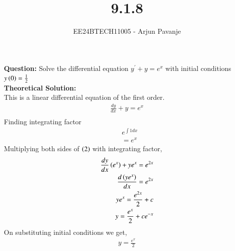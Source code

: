 \documentclass[journal]{IEEEtran}
\begin{document}

\vspace{3cm}

\title{9.1.8}
\author{EE24BTECH11005 - Arjun Pavanje}
{\let\newpage\relax\maketitle}
\textbf{Question:}
Solve the differential equation $y^{\prime}+y=e^x$ with initial conditions $y\left(0\right)=\frac{1}{2}$
\solution\\
\textbf{Theoretical Solution:}\\
This is a linear differential equation of the first order.
\begin{align}
  \frac{dy}{dx} + y = e^x\\
\end{align}
Finding integrating factor 
\begin{align}
  &e^{\int 1dx}\\
  &=e^x
\end{align}
Multiplying both sides of $\left(2\right)$ with integrating factor,
\begin{align}
  \frac{dy}{dx}\left(e^x\right) + ye^x = e^{2x}\\
  \frac{d\left(ye^x\right)}{dx}=e^{2x}\\
  ye^x=\frac{e^{2x}}{2}+c\\
  y=\frac{e^x}{2}+ce^{-x}
\end{align}
On substituting initial conditions we get,
\begin{align}
  y=\frac{e^x}{2}
\end{align}
\end{document}
